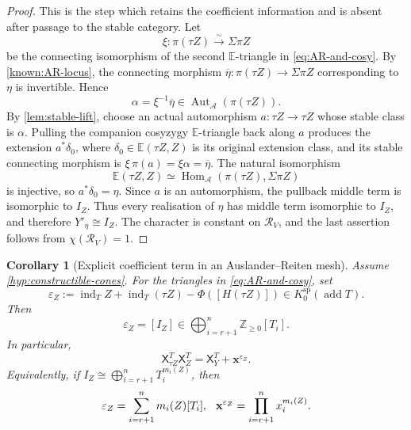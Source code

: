 \documentclass[11pt,reqno]{article}
\numberwithin{equation}{section}
\newtheorem{corollary}[corollary]{Corollary}
\theoremstyle{definition}
\DeclareMathOperator{\add}{add}
\DeclareMathOperator{\Aut}{Aut}
\DeclareMathOperator{\Hom}{Hom}
\DeclareMathOperator{\ind}{ind}
\newcommand{\A}{\mathcal A}
\newcommand{\E}{\mathbb E}
\newcommand{\X}{\mathsf X}
\newcommand{\bx}{\mathbf x}
\begin{document}
\begin{proof}
This is the step which retains the coefficient information and is absent after passage to the stable category.  Let
\[
 \xi\colon\pi(\tau Z)\xrightarrow{\sim}\Sigma\pi Z
\]
be the connecting isomorphism of the second $\E$-triangle in \eqref{eq:AR-and-cosy}.  By \cref{known:AR-locus}, the connecting morphism $\overline\eta\colon\pi(\tau Z)\to\Sigma\pi Z$ corresponding to $\eta$ is invertible.  Hence
\[
 \alpha=\xi^{-1}\overline\eta\in\Aut_{\A}(\pi(\tau Z)).
\]
By \cref{lem:stable-lift}, choose an actual automorphism $a\colon\tau Z\to\tau Z$ whose stable class is $\alpha$.  Pulling the companion cosyzygy $\E$-triangle back along $a$ produces the extension $a^*\delta_0$, where $\delta_0\in\E(\tau Z,Z)$ is its original extension class, and its stable connecting morphism is $\xi\,\pi(a)=\xi\alpha=\overline\eta$.  The natural isomorphism
\[
 \E(\tau Z,Z)\simeq\Hom_{\A}(\pi(\tau Z),\Sigma\pi Z)
\]
is injective, so $a^*\delta_0=\eta$.  Since $a$ is an automorphism, the pullback middle term is isomorphic to $I_Z$.  Thus every realisation of $\eta$ has middle term isomorphic to $I_Z$, and therefore $Y'_\eta\cong I_Z$.  The character is constant on $\mathcal R_V$, and the last assertion follows from $\chi(\mathcal R_V)=1$.
\end{proof}

\begin{corollary}[Explicit coefficient term in an Auslander--Reiten mesh]\label{cor:AR}
Assume \cref{hyp:constructible-cones}.  For the triangles in \eqref{eq:AR-and-cosy}, set
\[
 \varepsilon_Z
 :=\ind_T Z+\ind_T(\tau Z)-\Phi([H(\tau Z)])
 \in K_0^{\mathrm{sp}}(\add T).
\]
Then
\begin{equation}\label{eq:AR-frozen-class}
 \varepsilon_Z=[I_Z]
 \in \bigoplus_{i=r+1}^{n}\mathbb Z_{\ge0}[T_i].
\end{equation}
In particular,
\begin{equation}\label{eq:AR-explicit}
 \X^T_{\tau Z}\X^T_Z
 =\X^T_Y+\bx^{\varepsilon_Z}.
\end{equation}
Equivalently, if $I_Z\cong\bigoplus_{i=r+1}^{n}T_i^{m_i(Z)}$, then
\[
 \varepsilon_Z=\sum_{i=r+1}^{n}m_i(Z)[T_i],
 \hspace{2.5mm}
 \bx^{\varepsilon_Z}=\prod_{i=r+1}^{n}x_i^{m_i(Z)}.
\]
\end{corollary}
\end{document}
